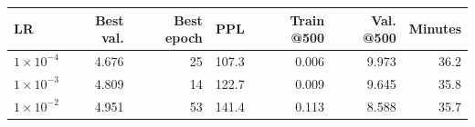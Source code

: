 \begin{tabular}{lrrrrrr}
\toprule
LR & Best val. & Best epoch & PPL & Train @500 & Val. @500 & Minutes \\
\midrule
$1\times10^{-4}$ & 4.676 & 25 & 107.3 & 0.006 & 9.973 & 36.2 \\
$1\times10^{-3}$ & 4.809 & 14 & 122.7 & 0.009 & 9.645 & 35.8 \\
$1\times10^{-2}$ & 4.951 & 53 & 141.4 & 0.113 & 8.588 & 35.7 \\
\bottomrule
\end{tabular}
